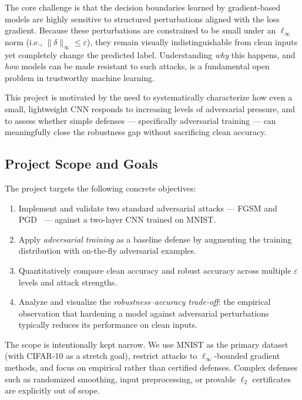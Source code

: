 \documentclass[conference]{IEEEtran}
\begin{document}
The core challenge is that the decision boundaries learned by gradient-based
models are highly sensitive to structured perturbations aligned with the loss
gradient. Because these perturbations are constrained to be small under an
$\ell_\infty$ norm (i.e., $\|\delta\|_\infty \leq \varepsilon$), they remain
visually indistinguishable from clean inputs yet completely change the
predicted label. Understanding \emph{why} this happens, and \emph{how} models
can be made resistant to such attacks, is a fundamental open problem in
trustworthy machine learning.

This project is motivated by the need to systematically characterize how
even a small, lightweight CNN responds to increasing levels of adversarial
pressure, and to assess whether simple defenses — specifically adversarial
training — can meaningfully close the robustness gap without sacrificing
clean accuracy.

\subsection{Project Scope and Goals}

The project targets the following concrete objectives:

\begin{enumerate}
    \item Implement and validate two standard adversarial attacks — FGSM
          \cite{goodfellow2015fgsm} and PGD~\cite{madry2018pgd} — against
          a two-layer CNN trained on MNIST.

    \item Apply \emph{adversarial training} as a baseline defense by
          augmenting the training distribution with on-the-fly adversarial
          examples.

    \item Quantitatively compare clean accuracy and robust accuracy across
          multiple $\varepsilon$ levels and attack strengths.

    \item Analyze and visualize the \emph{robustness–accuracy trade-off}:
          the empirical observation that hardening a model against adversarial
          perturbations typically reduces its performance on clean inputs.
\end{enumerate}

The scope is intentionally kept narrow. We use MNIST as the primary dataset
(with CIFAR-10 as a stretch goal), restrict attacks to $\ell_\infty$-bounded
gradient methods, and focus on empirical rather than certified defenses.
Complex defenses such as randomized smoothing, input preprocessing, or
provable $\ell_2$ certificates are explicitly out of scope.
\end{document}
